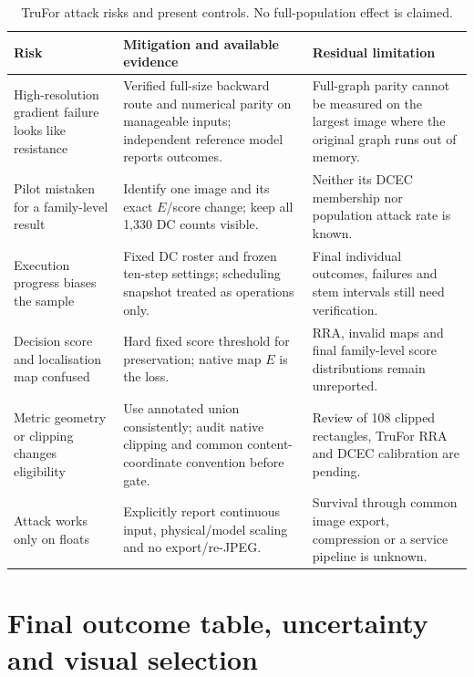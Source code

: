 \begin{table}[htbp]
\centering\footnotesize
\caption{TruFor attack risks and present controls. No full-population effect is claimed.}
\label{tab:app-adv-trufor-risks}
\begin{tabularx}{\textwidth}{@{}>{\raggedright\arraybackslash}p{}>{\raggedright\arraybackslash}p{}>{\raggedright\arraybackslash}X@{}}
\toprule
Risk & Mitigation and available evidence & Residual limitation \\
\midrule
High-resolution gradient failure looks like resistance & Verified full-size backward route and numerical parity on manageable inputs; independent reference model reports outcomes. & Full-graph parity cannot be measured on the largest image where the original graph runs out of memory. \\
Pilot mistaken for a family-level result & Identify one image and its exact $E$/score change; keep all 1,330 DC counts visible. & Neither its DCEC membership nor population attack rate is known. \\
Execution progress biases the sample & Fixed DC roster and frozen ten-step settings; scheduling snapshot treated as operations only. & Final individual outcomes, failures and stem intervals still need verification. \\
Decision score and localisation map confused & Hard fixed score threshold for preservation; native map $E$ is the loss. & RRA, invalid maps and final family-level score distributions remain unreported. \\
Metric geometry or clipping changes eligibility & Use annotated union consistently; audit native clipping and common content-coordinate convention before gate. & Review of 108 clipped rectangles, TruFor RRA and DCEC calibration are pending. \\
Attack works only on floats & Explicitly report continuous input, physical/model scaling and no export/re-JPEG. & Survival through common image export, compression or a service pipeline is unknown. \\
\bottomrule
\end{tabularx}
\end{table}

\section{Final outcome table, uncertainty and visual selection}
\label{app:adv-reporting}

